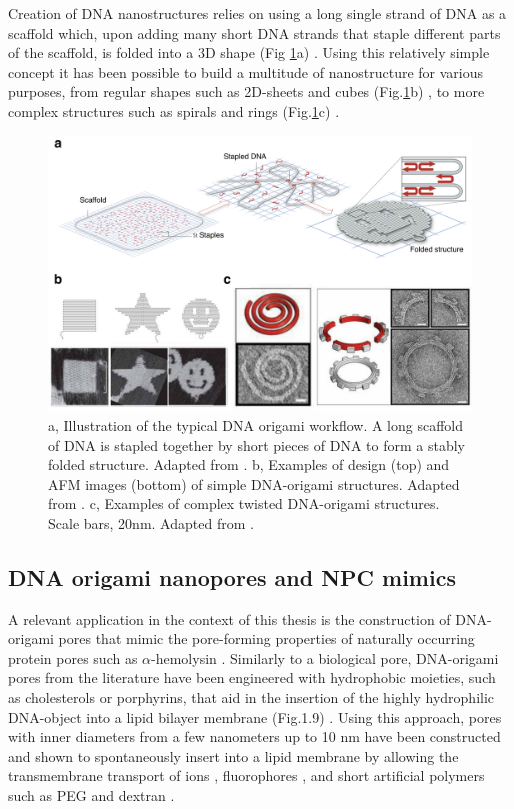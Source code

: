 Creation of DNA nanostructures relies on using a long single strand of DNA as a scaffold which, upon adding many short DNA strands that staple different parts of the scaffold, is folded into a 3D shape (Fig \ref{fig:fig1.8}a) \cite{Sanderson2010}. Using this relatively simple concept it has been possible to build a multitude of nanostructure for various purposes, from regular shapes such as 2D-sheets and cubes (Fig.\ref{fig:fig1.8}b) \cite{Rothemund2006}, to more complex structures such as spirals and rings (Fig.\ref{fig:fig1.8}c) \cite{Dietz2009}.



\begin{figure}[!htbp]
	\centering
	\includegraphics[width=1\linewidth]{figures/Figure1.8.pdf}
	\caption{a, Illustration of the typical DNA origami workflow. A long scaffold of DNA is stapled together by short pieces of DNA to form a stably folded structure. Adapted from \cite{Sanderson2010}. b, Examples of design (top) and AFM images (bottom) of simple DNA-origami structures. Adapted from \cite{Rothemund2006}. c, Examples of complex twisted DNA-origami structures. Scale bars, 20nm. Adapted from \cite{Dietz2009}.}
	\label{fig:fig1.8}
\end{figure}
\newpage
\subsection{DNA origami nanopores and NPC mimics}
A relevant application in the context of this thesis is the construction of DNA-origami pores that mimic the pore-forming properties of naturally occurring protein pores such as $\alpha$-hemolysin \cite{Sugawara2015}. Similarly to a biological pore, DNA-origami pores from the literature have been engineered with hydrophobic moieties, such as cholesterols or porphyrins, that aid in the insertion of the highly hydrophilic DNA-object into a lipid bilayer membrane (Fig.1.9) \cite{Hernandez-Ainsa2014}. Using this approach, pores with inner diameters from a few nanometers \cite{Martin2012,Burns2016} up to 10 nm \cite{Thomsen2019,Iwabuchi2021} have been constructed and shown to spontaneously insert into a lipid membrane by allowing the transmembrane transport of ions \cite{Martin2012,Gopfrich2016}, fluorophores \cite{Krishnan2016,Thomsen2019}, and short artificial polymers such as PEG \cite{Burns2016} and dextran \cite{Thomsen2019,Iwabuchi2021}. 


